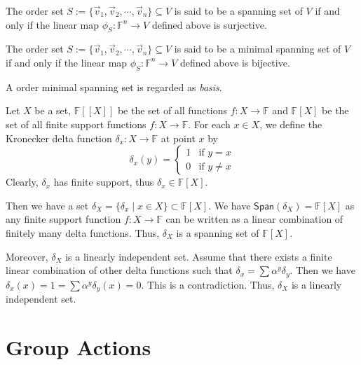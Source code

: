 \documentclass[
	11pt, %
	fleqn, %
	a4paper, %
]{LegrandOrangeBook}
\renewcommand{\span}[1]{\mathsf{Span}(#1)} %
\newcommand{\F}{\mathbb{F}} %
\begin{document}
\begin{proposition}
    The order set $S := \{\vec{v}_1, \vec{v}_2, \cdots, \vec{v}_n\} \subseteq V$ is said to be a spanning set of $V$ if and only if the linear map $\phi_S: \F^n \to V$ defined above is surjective.
\end{proposition}

\begin{proposition} \label{prop:minimal_spanning_set}
    The order set $S := \{\vec{v}_1, \vec{v}_2, \cdots, \vec{v}_n\} \subseteq V$ is said to be a minimal spanning set of $V$ if and only if the linear map $\phi_S: \F^n \to V$ defined above is bijective.
\end{proposition}

\begin{remark}
    A order minimal spanning set is regarded as \emph{basis}.
\end{remark}

\begin{example}
    Let $X$ be a set, $\F[[X]]$ be the set of all functions $f: X \to \F$ and $\F[X]$ be the set of all finite support functions $f: X \to \F$. For each $x \in X$, we define the Kronecker delta function $\delta_x : X \to \F$ at point $x$ by 
    \[
        \delta_x(y) = \begin{cases}
            1 & \text{if } y = x \\
            0 & \text{if } y \neq x
        \end{cases}
    \]
    Clearly, $\delta_x$ has finite support, thus $\delta_x \in \F[X]$.

    Then we have a set $\delta_X = \{\delta_x \mid x \in X\} \subset \F[X]$. We have $\span{\delta_X} = \F[X]$ as any finite support function $f: X \to \F$ can be written as a linear combination of finitely many delta functions. Thus, $\delta_X$ is a spanning set of $\F[X]$.

    Moreover, $\delta_X$ is a linearly independent set. Assume that there exists a finite linear combination of other delta functions such that $\delta_x = \sum \alpha^y \delta_{y}$. Then we have $\delta_x(x) = 1 = \sum \alpha^y \delta_y(x) = 0$. This is a contradiction. Thus, $\delta_X$ is a linearly independent set.
\end{example}

\newpage

\section{Group Actions}
\end{document}
